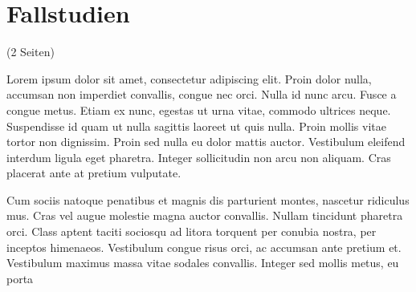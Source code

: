 \clearpage
\section{Fallstudien}
\label{sec:fallstudien}

(2 Seiten)

Lorem ipsum dolor sit amet, consectetur adipiscing elit. Proin dolor nulla, accumsan non imperdiet convallis, congue nec orci. Nulla id nunc arcu. Fusce a congue metus. Etiam ex nunc, egestas ut urna vitae, commodo ultrices neque. Suspendisse id quam ut nulla sagittis laoreet ut quis nulla. Proin mollis vitae tortor non dignissim. Proin sed nulla eu dolor mattis auctor. Vestibulum eleifend interdum ligula eget pharetra. Integer sollicitudin non arcu non aliquam. Cras placerat ante at pretium vulputate.

Cum sociis natoque penatibus et magnis dis parturient montes, nascetur ridiculus mus. Cras vel augue molestie magna auctor convallis. Nullam tincidunt pharetra orci. Class aptent taciti sociosqu ad litora torquent per conubia nostra, per inceptos himenaeos. Vestibulum congue risus orci, ac accumsan ante pretium et. Vestibulum maximus massa vitae sodales convallis. Integer sed mollis metus, eu porta

\clearpage